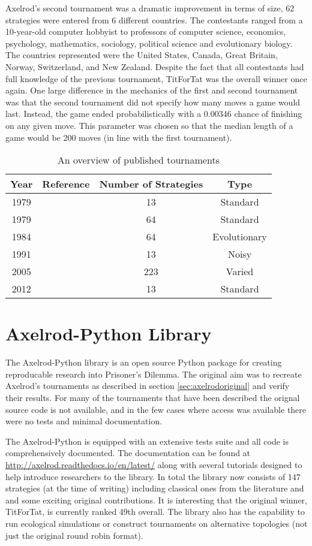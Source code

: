 Axelrod's second tournament was a dramatic improvement in terms of size, 62 strategies were entered from 6 different countries.
The contestants ranged from a 10-year-old computer hobbyist to professors of computer science, economics, psychology, mathematics, sociology, political science and evolutionary biology.
The countries represented were the United States, Canada, Great Britain, Norway, Switzerland, and New Zealand.
Despite the fact that all contestants had full knowledge of the previous tournament, TitForTat was the overall winner once again.
One large difference in the mechanics of the first and second tournament was that the second tournament did not specify how many moves a game would last.
Instead, the game ended probabilistically with a 0.00346 chance of finishing on any given move.
This parameter was chosen so that the median length of a game would be 200 moves (in line with the first tournament).

\begin{table}[htbp]
\centering
\begin{tabular}{c c c c}
Year & Reference & Number of Strategies & Type\\
\hline
1979 & \cite{Axelrod1980a} & 13 & Standard\\
1979 & \cite{Axelrod1980b} & 64 & Standard\\
1984 & & 64 & Evolutionary\\
1991 & & 13 & Noisy\\
2005 & & 223 & Varied\\
2012 & & 13 & Standard\\
\hline
\end{tabular}
\label{tab:tournament_refs}
\caption{An overview of published tournaments}
\end{table}

\section{Axelrod-Python Library}

The Axelrod-Python library \cite{axelrodproject} is an open source Python package for creating reproducable research into Prisoner's Dilemma.
The original aim was to recreate Axelrod's tournaments as described in section \ref{sec:axelrodoriginal} and verify their results.
For many of the tournaments that have been described the orignal source code is not available, and in the few cases where access was available there were no tests and minimal documentation.

The Axelrod-Python is equipped with an extensive tests suite and all code is comprehensively documented.
The documentation can be found at \url{http://axelrod.readthedocs.io/en/latest/} along with several tutorials designed to help introduce researchers to the library.
In total the library now consists of 147 strategies (at the time of writing) including classical ones from the literature and and some exciting original contributions.
It is interesting that the original winner, TitForTat, is currently ranked 49th overall.
The library also has the capability to run ecological simulations or construct tournaments on alternative topologies (not just the original round robin format).




